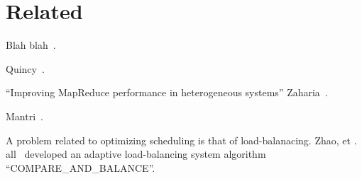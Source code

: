 \section{Related}
Blah blah~\cite{Eucalyptus}.

Quincy~\cite{Quincy}.

``Improving MapReduce performance in heterogeneous systems'' Zaharia~\cite{Zaharia}.

Mantri~\cite{Mantri}.

A problem related to optimizing scheduling is that of load-balanacing.  Zhao, et
. all~\cite{Zhao} developed an adaptive load-balancing system algorithm
``COMPARE\_AND\_BALANCE''.
